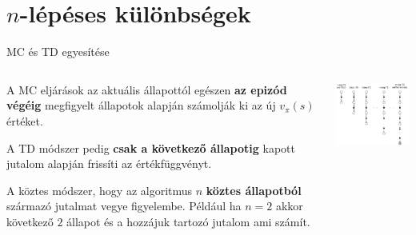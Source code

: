 \documentclass[english, aspectratio=169]{beamer}
\makeatletter
\let\origtableofcontents=\tableofcontents
\def\tableofcontents{\@ifnextchar[{\origtableofcontents}{\gobbletableofcontents}}
\def\gobbletableofcontents#1{\origtableofcontents}
\makeatother
\begin{document}
\section{$n$-lépéses különbségek}

\begin{frame}
\tableofcontents[currentsection]
\end{frame}

\begin{frame}{MC és TD egyesítése}
\begin{columns}
\begin{column}{.5\textwidth}
A MC eljárások az aktuális állapottól egészen \textbf{az epizód végéig} megfigyelt állapotok alapján számolják ki az új $v_\pi(s)$ értéket.\par\smallskip
A TD módszer pedig \textbf{csak a következő állapotig} kapott jutalom alapján frissíti az értékfüggvényt.\par\smallskip
A köztes módszer, hogy az algoritmus $n$ \textbf{köztes állapotból} származó jutalmat vegye figyelembe. Például ha $n=2$ akkor következő $2$ állapot és a hozzájuk tartozó jutalom ami számít.
\end{column}
\begin{column}{.5\textwidth}
\begin{center}
\includegraphics[width=7cm, keepaspectratio]{images/mc_td_14.png}
\end{center}
\end{column}
\end{columns}
\end{frame}
\end{document}
